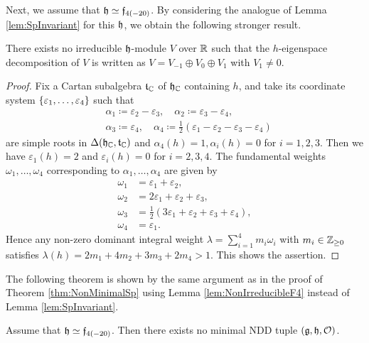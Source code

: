 Next, we assume that $\mathfrak{h} \simeq \mathfrak{f}_{4(-20)}$.
By considering the analogue of Lemma \ref{lem:SpInvariant} for this $\mathfrak{h}$, we obtain the following stronger result.

\begin{lemma} \label{lem:NonIrreducibleF4}
	There exists no irreducible $\mathfrak{h}$-module $V$ over $\mathbb{R}$ such that the $h$-eigenspace decomposition of $V$ is written as $V = V_{-1} \oplus V_0 \oplus V_1$ with $V_1 \neq 0$.
\end{lemma}

\begin{proof}
	Fix a Cartan subalgebra $\mathfrak{t}_{\mathbb{C}}$ of $\mathfrak{h}_{\mathbb{C}}$ containing $h$, and take its coordinate system $\left\{\varepsilon_1, \ldots, \varepsilon_4 \right\}$ such that
	\begin{align*}
		&\alpha_1 \coloneq \varepsilon_2 - \varepsilon_3, \quad \alpha_2 \coloneq \varepsilon_3 - \varepsilon_4, \\
		&\alpha_3 \coloneq \varepsilon_4, \quad \alpha_4 \coloneq \frac{1}{2}(\varepsilon_1 - \varepsilon_2 - \varepsilon_3 - \varepsilon_4)
	\end{align*}
	are simple roots in $\Delta(\mathfrak{h}_{\mathbb{C}}, \mathfrak{t}_{\mathbb{C}})$ and $\alpha_4(h) = 1, \alpha_i(h) = 0$ for $i = 1, 2, 3$.
	Then we have $\varepsilon_1(h) = 2$ and $\varepsilon_i(h) = 0$ for $i = 2, 3, 4$.
	The fundamental weights $\omega_1, \ldots, \omega_4$ corresponding to $\alpha_1, \ldots, \alpha_4$ are given by
	\begin{align*}
		\omega_1 &= \varepsilon_1 + \varepsilon_2, \\
		\omega_2 &= 2\varepsilon_1 + \varepsilon_2 + \varepsilon_3, \\
		\omega_3 &= \frac{1}{2}(3\varepsilon_1 + \varepsilon_2 + \varepsilon_3 + \varepsilon_4), \\
		\omega_4 &= \varepsilon_1.
	\end{align*}
	Hence any non-zero dominant integral weight $\lambda = \sum_{i=1}^4 m_i \omega_i$ with $m_i \in \mathbb{Z}_{\geq 0}$ satisfies $\lambda(h) = 2m_1 + 4m_2 + 3m_3 + 2m_4 > 1$.
	This shows the assertion.
\end{proof}

The following theorem is shown by the same argument as in the proof of Theorem \ref{thm:NonMinimalSp} using Lemma \ref{lem:NonIrreducibleF4} instead of Lemma \ref{lem:SpInvariant}.

\begin{theorem} \label{thm:NonMinimalF4}
	Assume that $\mathfrak{h} \simeq \mathfrak{f}_{4(-20)}$.
	Then there exists no minimal NDD tuple $(\mathfrak{g}, \mathfrak{h}, \mathcal{O})$.
\end{theorem}

